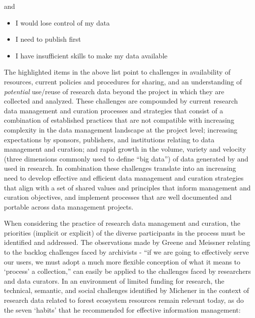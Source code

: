 \documentclass[paper]{ijdc-v9}
\providecommand{\tightlist}{%
  \setlength{\itemsep}{0pt}\setlength{\parskip}{0pt}}
\begin{document}
and

\begin{itemize}
\tightlist
\item
  I would lose control of my data
\item
  I need to publish first
\item
  I have insufficient skills to make my data available \autocite[Table
  G, supplemental materials]{tenopir_changes_2015}
\end{itemize}

The highlighted items in the above list point to challenges in
availability of resources, current policies and procedures for sharing,
and an understanding of \emph{potential} use/reuse of research data
beyond the project in which they are collected and analyzed. These
challenges are compounded by current research data management and
curation processes and strategies that consist of a combination of
established practices that are not compatible with increasing complexity
in the data management landscape at the project level; increasing
expectations by sponsors, publishers, and institutions relating to data
management and curation; and rapid growth in the volume, variety and
velocity (three dimensions commonly used to define ``big data'') of data
generated by and used in research. In combination these challenges
translate into an increasing need to develop effective and efficient
data management and curation strategies that align with a set of shared
values and principles that inform management and curation objectives,
and implement processes that are well documented and portable across
data management projects.

When considering the practice of research data management and curation,
the priorities (implicit or explicit) of the diverse participants in the
process must be identified and addressed. The observations made by
Greene and Meissner \autocite*{greene_more_2005} relating to the backlog
challenges faced by archivists - ``if we are going to effectively serve
our users, we must adopt a much more flexible conception of what it
means to `process' a collection,'' \autocite[pp.~233]{greene_more_2005}
can easily be applied to the challenges faced by researchers and data
curators. In an environment of limited funding for research, the
technical, semantic, and social challenges identified by Michener
\autocite*{michener_role_1999} in the context of research data related
to forest ecosystem resources remain relevant today, as do the seven
`habits' that he recommended for effective information management:
\end{document}
